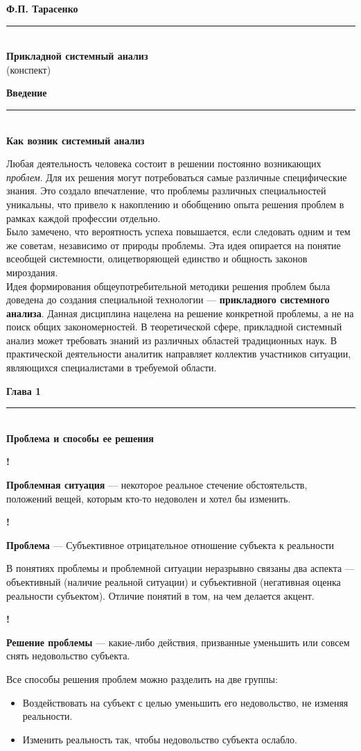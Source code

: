 \documentclass{article}
\newcommand{\note}[1]{\textit{#1}}
\newcommand{\important}[1]{\textbf{#1}}
\renewcommand{\section}[2]{
	\vspace{6em}
	\begin{flushright}
	\Large
	\baselineskip=0.5\baselineskip
	\textbf{#1}
	\\
	\rule[0.5\baselineskip]{\textwidth}{0.15pt}
	\\
	\textbf{#2}
	\end{flushright}
	}
\renewcommand{\title}[2]{
	\begin{center}
		\LARGE
		\baselineskip=0.5\baselineskip
		\textbf{#1}
		\\
		\rule[0.5\baselineskip]{0.7\textwidth}{0.15pt}
		\\
		\textbf{#2}
		\\\baselineskip=2\baselineskip(конспект)		
	\end{center}
	}
\newcommand{\define}[2]{
	\textbf{#1} --- #2
	}
\newcommand{\marked}[2]{
	\begin{flushright}\textbf{!}\hspace{2ex}\vline\hspace{2ex}
		\begin{minipage}{0.9\textwidth}
			\define{#1}{#2}
		\end{minipage}
	\end{flushright}
	}
\begin{document}
\title{Ф.П. Тарасенко}{Прикладной системный анализ}
\section{Введение}{Как возник системный анализ}
Любая деятельность человека состоит в решении постоянно возникающих \note{проблем}. Для их решения могут потребоваться самые различные специфические знания. Это создало впечатление, что проблемы различных специальностей уникальны, что привело к накоплению и обобщению опыта решения проблем в рамках каждой профессии отдельно.\\
Было замечено, что вероятность успеха повышается, если следовать одним и тем же советам, независимо от природы проблемы. Эта идея опирается на понятие всеобщей системности, олицетворяющей единство и общность законов мироздания.\\
Идея формирования общеупотребительной методики решения проблем была доведена до создания специальной технологии --- \important{прикладного системного анализа}. Данная дисциплина нацелена на решение конкретной проблемы, а не на поиск общих закономерностей. В теоретической сфере, прикладной системный анализ может требовать знаний из различных областей традиционных наук. В практической деятельности аналитик направляет коллектив участников ситуации, являющихся специалистами в требуемой области.
\section{Глава 1}{Проблема и способы ее решения}
\marked{Проблемная ситуация}{некоторое реальное стечение обстоятельств, положений вещей, которым кто-то недоволен и хотел бы изменить.}
\marked{Проблема}{Субъективное отрицательное отношение субъекта к реальности}
В понятиях проблемы и проблемной ситуации неразрывно связаны два аспекта --- объективный (наличие реальной ситуации) и субъективной (негативная оценка реальности субъектом). Отличие понятий в том, на чем делается акцент.
\marked{Решение проблемы}{какие-либо действия, призванные уменьшить или совсем снять недовольство субъекта.}
Все способы решения проблем можно разделить на две группы:
\begin{itemize}
	\item Воздействовать на субъект с целью уменьшить его недовольство, не изменяя реальности.
	\item Изменить реальность так, чтобы недовольство субъекта ослабло.
\end{itemize}
\end{document}
